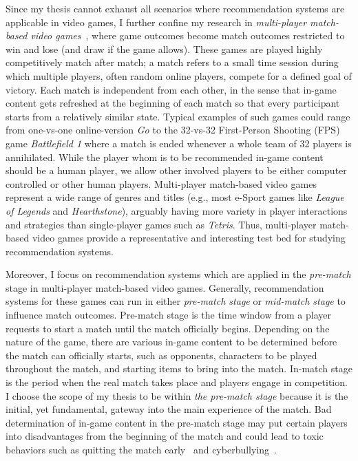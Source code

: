 Since my thesis cannot exhaust all scenarios where recommendation systems are applicable in video games, I further confine my research in \textit{multi-player match-based video games}~\cite{guo2012analysis}, where game outcomes become match outcomes restricted to win and lose (and draw if the game allows). These games are played highly competitively match after match; a match refers to a small time session during which multiple players, often random online players, compete for a defined goal of victory. Each match is independent from each other, in the sense that in-game content gets refreshed at the beginning of each match so that every participant starts from a relatively similar state. Typical examples of such games could range from one-vs-one online-version \textit{Go} to the 32-vs-32 First-Person Shooting (FPS) game \textit{Battlefield 1} where a match is ended whenever a whole team of 32 players is annihilated. While the player whom is to be recommended in-game content should be a human player, we allow other involved players to be either computer controlled or other human players. Multi-player match-based video games represent a wide range of genres and titles  (e.g., most e-Sport games like \textit{League of Legends} and \textit{Hearthstone}), arguably having more variety in player interactions and strategies than single-player games such as \textit{Tetris}. Thus, multi-player match-based video games provide a representative and interesting test bed for studying recommendation systems.




Moreover, I focus on recommendation systems which are applied in the \textit{pre-match} stage in multi-player match-based video games. Generally, recommendation systems for these games can run in either \textit{pre-match stage} or \textit{mid-match stage} to influence match outcomes. Pre-match stage is the time window from a player requests to start a match until the match officially begins. Depending on the nature of the game, there are various in-game content to be determined before the match can officially starts, such as opponents, characters to be played throughout the match, and starting items to bring into the match. In-match stage is the period when the real match takes place and players engage in competition. I choose the scope of my thesis to be within \textit{the pre-match stage} because it is the initial, yet fundamental, gateway into the main experience of the match. Bad determination of in-game content in the pre-match stage may put certain players into disadvantages from the beginning of the match and could lead to toxic behaviors such as quitting the match early~\cite{shores2014identification} and cyberbullying~\cite{kwak2015exploring}. 


